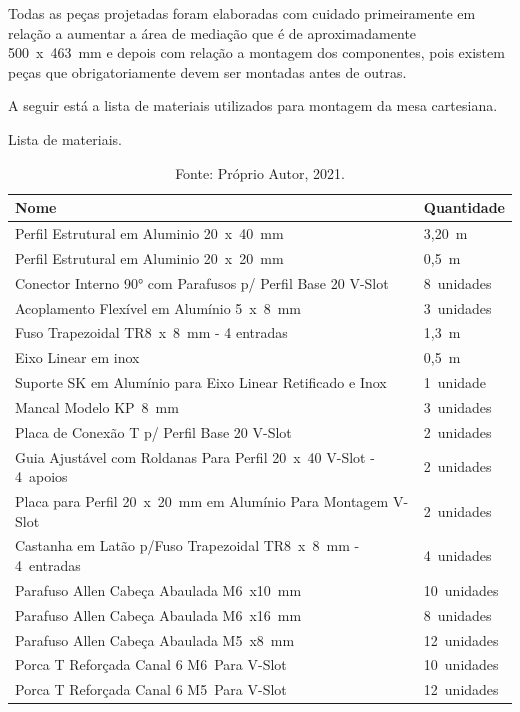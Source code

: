 Todas as peças projetadas foram elaboradas com cuidado primeiramente em relação a aumentar 
a área de mediação que é de aproximadamente 500~x~463~mm e depois com relação a montagem dos 
componentes, pois existem peças que obrigatoriamente devem ser montadas antes de outras. 

A seguir está a lista de materiais utilizados para montagem da mesa cartesiana.

\begin{table}[H]
    \footnotesize
    \centering
    \caption{Lista de materiais.}
    \begin{tabular}{ll}
        \hline
        \textbf{Nome} & \textbf{Quantidade}\\
        \hline
        Perfil Estrutural em Aluminio 20~x~40~mm & 3,20~m\\
        Perfil Estrutural em Aluminio 20~x~20~mm & 0,5~m\\
        Conector Interno 90° com Parafusos p/ Perfil Base 20 V-Slot & 8~unidades\\
        Acoplamento Flexível em Alumínio 5~x~8~mm & 3~unidades\\
        Fuso Trapezoidal TR8~x~8~mm - 4 entradas & 1,3~m\\
        Eixo Linear em inox & 0,5~m\\
        Suporte SK em Alumínio para Eixo Linear Retificado e Inox & 1~unidade\\
        Mancal Modelo KP~8~mm & 3~unidades\\
        Placa de Conexão T p/ Perfil Base 20 V-Slot &2~unidades\\
        Guia Ajustável com Roldanas Para Perfil 20~x~40 V-Slot - 4~apoios & 2~unidades\\
        Placa para Perfil 20~x~20~mm em Alumínio Para Montagem V-Slot & 2~unidades\\
        Castanha em Latão p/Fuso Trapezoidal TR8~x~8~mm - 4~entradas & 4~unidades\\
        Parafuso Allen Cabeça Abaulada M6~x10~mm & 10~unidades\\
        Parafuso Allen Cabeça Abaulada M6~x16~mm & 8~unidades\\
        Parafuso Allen Cabeça Abaulada M5~x8~mm & 12~unidades\\
        Porca T Reforçada Canal 6 M6~Para V-Slot & 10~unidades\\
        Porca T Reforçada Canal 6 M5~Para V-Slot & 12~unidades\\
        \hline       
    \end{tabular}
    \caption*{Fonte: Próprio Autor, 2021.}
    \label{tab:listamateriais}
\end{table}

